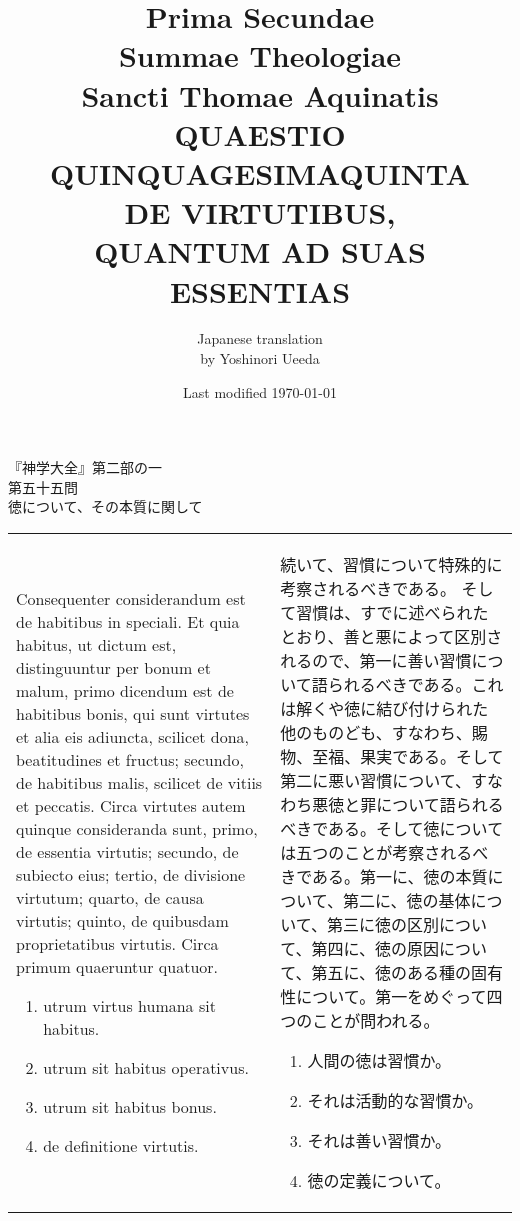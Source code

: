 \documentclass[10pt]{jsarticle}
\title{{\bf Prima Secundae}\\{\HUGE Summae Theologiae}\\Sancti Thomae
Aquinatis\\{\sffamily QUAESTIO QUINQUAGESIMAQUINTA}\\{\bf DE VIRTUTIBUS, \\QUANTUM AD SUAS ESSENTIAS}}
\author{Japanese translation\\by Yoshinori {\sc Ueeda}}
\date{Last modified \today}
\begin{document}
\maketitle
\thispagestyle{empty}
\begin{center}
{\Large 『神学大全』第二部の一\\第五十五問\\徳について、その本質に関して}
\end{center}

\begin{longtable}{p{21em}p{21em}}
Consequenter considerandum est de habitibus in speciali. Et quia
habitus, ut dictum est, distinguuntur per bonum et malum, primo
dicendum est de habitibus bonis, qui sunt virtutes et alia eis
adiuncta, scilicet dona, beatitudines et fructus; secundo, de
habitibus malis, scilicet de vitiis et peccatis. Circa virtutes autem
quinque consideranda sunt, primo, de essentia virtutis; secundo, de
subiecto eius; tertio, de divisione virtutum; quarto, de causa
virtutis; quinto, de quibusdam proprietatibus virtutis. Circa primum
quaeruntur quatuor.

\begin{enumerate}
 \item utrum virtus humana sit habitus.
 \item utrum sit habitus operativus.
 \item utrum sit habitus bonus.
 \item de definitione virtutis.
\end{enumerate}

&

続いて、習慣について特殊的に考察されるべきである。
そして習慣は、すでに述べられたとおり、善と悪によって区別されるので、第一に善い習慣について語られるべきである。これは解くや徳に結び付けられた他のものども、すなわち、賜物、至福、果実である。そして第二に悪い習慣について、すなわち悪徳と罪について語られるべきである。そして徳については五つのことが考察されるべきである。第一に、徳の本質について、第二に、徳の基体について、第三に徳の区別について、第四に、徳の原因について、第五に、徳のある種の固有性について。第一をめぐって四つのことが問われる。

\begin{enumerate}
 \item 人間の徳は習慣か。
 \item それは活動的な習慣か。
 \item それは善い習慣か。
 \item 徳の定義について。
\end{enumerate}
\end{longtable}
\end{document}
